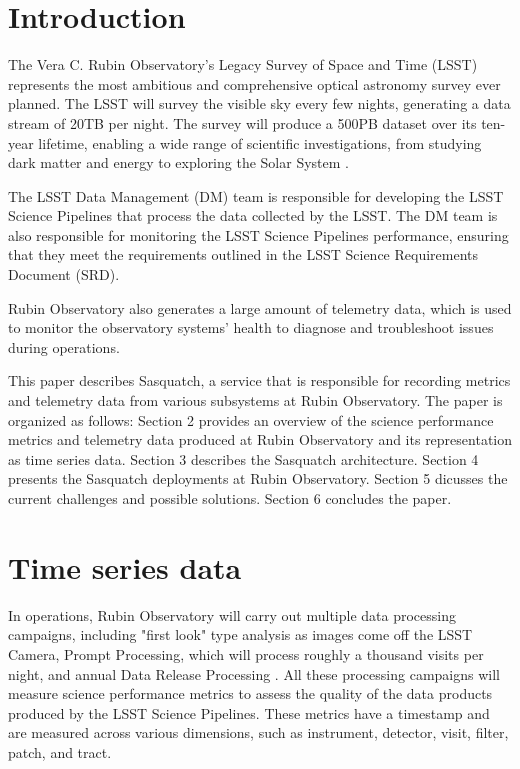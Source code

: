 \section{Introduction}

The Vera C. Rubin Observatory's Legacy Survey of Space and Time (LSST) represents the most ambitious and comprehensive optical astronomy survey ever planned. The LSST will survey the visible sky every few nights, generating a data stream of 20TB per night. The survey will produce a 500PB dataset over its ten-year lifetime, enabling a wide range of scientific investigations, from studying dark matter and energy to exploring the Solar System \cite{2019ApJ...873..111I}.

The LSST Data Management (DM) team is responsible for developing the LSST Science Pipelines that process the data collected by the LSST. The DM team is also responsible for monitoring the LSST Science Pipelines performance, ensuring that they meet the requirements outlined in the LSST Science Requirements Document (SRD). \cite{LPM-17}

Rubin Observatory also generates a large amount of telemetry data, which is used to monitor the observatory systems' health to diagnose and troubleshoot issues during operations.

This paper describes Sasquatch, a service that is responsible for recording metrics and telemetry data from various subsystems at Rubin Observatory. The paper is organized as follows: Section 2 provides an overview of the science performance metrics and telemetry data produced at Rubin Observatory and its representation as time series data. Section 3 describes the Sasquatch architecture. Section 4 presents the Sasquatch deployments at Rubin Observatory. Section 5 dicusses the current challenges and possible solutions. Section 6 concludes the paper.

\section{Time series data}

In operations, Rubin Observatory will carry out multiple data processing campaigns, including "first look" type analysis as images come off the LSST Camera, Prompt Processing, which will process roughly a thousand visits per night, and annual Data Release Processing \cite{LSE-163}. All these processing campaigns will measure science performance metrics to assess the quality of the data products produced by the LSST Science Pipelines. \cite{DMTN-211} These metrics have a timestamp and are measured across various dimensions, such as instrument, detector, visit, filter, patch, and tract.

